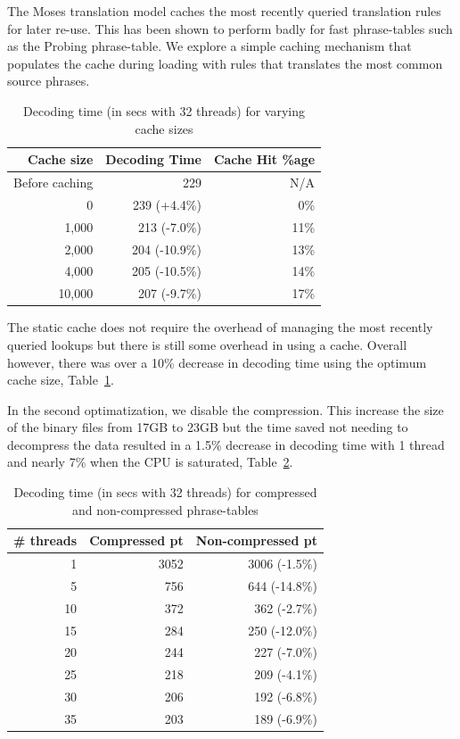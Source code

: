 \documentclass[11pt]{article}
\begin{document}
The Moses translation model caches the most recently queried translation rules for later re-use. This has been shown to perform badly for fast phrase-tables such as the Probing phrase-table. We explore a simple caching mechanism that populates the cache during loading with rules that translates the most common source phrases. 
\begin{table}[h]
\small
\begin{center}
\begin{tabular}{|r|r|r|} \hline
Cache size	& Decoding Time & Cache Hit \%age	\\ \hline
Before caching	& 229	& N/A	 \\
0		& 239 (+4.4\%)	& 0\% \\
1,000		& 213 (-7.0\%)	& 11\% \\
2,000		& 204 (-10.9\%)	& 13\% \\
4,000		& 205 (-10.5\%)	& 14\% \\
10,000		& 207 (-9.7\%)	& 17\% \\ \hline
\end{tabular}
\end{center}
\caption{Decoding time (in secs with 32 threads) for varying cache sizes}
\label{tab:cache}
\end{table}
The static cache does not require the overhead of managing the most recently queried lookups but there is still some overhead in using a cache. Overall however, there was over a 10\% decrease in decoding time using the optimum cache size, Table~\ref{tab:cache}.

In the second optimatization, we disable the compression. This increase the size of the binary files from 17GB to 23GB but the time saved not needing to decompress the data resulted in a 1.5\% decrease in decoding time with 1 thread and nearly 7\% when the CPU is saturated, Table~\ref{tab:compression}.
\begin{table}[h]
\small
\begin{center}
\begin{tabular}{|r|r|r|} \hline
\# threads	& Compressed pt & Non-compressed pt \\ \hline
1		& 3052	& 3006 (-1.5\%) \\
5		& 756	& 644 (-14.8\%) \\
10		& 372	& 362 (-2.7\%) \\
15		& 284	& 250 (-12.0\%) \\
20		& 244	& 227 (-7.0\%) \\
25		& 218	& 209 (-4.1\%) \\
30		& 206	& 192 (-6.8\%) \\
35		& 203	& 189 (-6.9\%) \\ \hline
\end{tabular}
\end{center}
\caption{Decoding time (in secs with 32 threads) for compressed and non-compressed phrase-tables}
\label{tab:compression}
\end{table}
\end{document}
